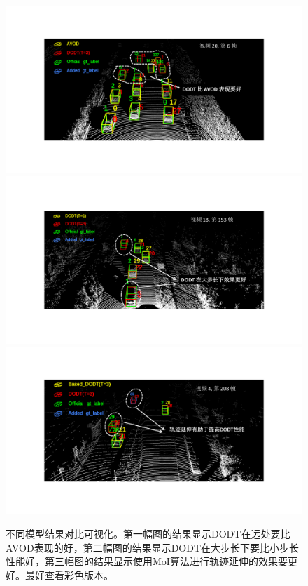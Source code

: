 \begin{figure}[!t]
	\centering
	\includegraphics[trim={4cm, 4cm, 5cm, 3.7cm}, clip, width=\textwidth]{./imgs/result_compare_01.pdf}
	\includegraphics[trim={4cm, 4cm, 5cm, 3.7cm}, clip, width=\textwidth]{./imgs/result_compare_02.pdf}
	\includegraphics[trim={4cm, 4cm, 5cm, 3.5cm}, clip, width=\textwidth]{./imgs/result_compare_03.pdf}
	\caption{不同模型结果对比可视化。第一幅图的结果显示DODT在远处要比AVOD表现的好，第二幅图的结果显示DODT在大步长下要比小步长性能好，第三幅图的结果显示使用MoI算法进行轨迹延伸的效果要更好。最好查看彩色版本。}
	\label{fig:result_compare}
\end{figure}
